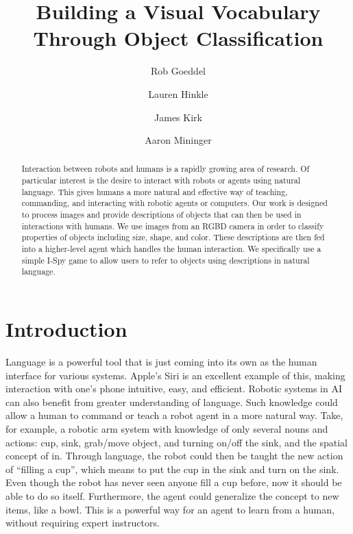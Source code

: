 \documentclass[11pt]{article}
\title{Building a Visual Vocabulary Through Object Classification}
\author{Rob Goeddel \and Lauren Hinkle \and James Kirk \and Aaron Mininger}
\date{}
\newcommand{\xxx}[1]{{\bf \color{red} #1}}
\begin{document}
\maketitle


\begin{abstract}
Interaction between robots and humans is a rapidly growing area of research.
Of particular interest is the desire to interact with robots or agents using
natural language. This gives humans a more natural and effective way of teaching,
commanding, and interacting with robotic agents or computers. Our work is
designed to process images and provide descriptions of objects that can then be
used in interactions with humans. We use images from an RGBD camera in order to
classify properties of objects including size, shape, and color. These
descriptions are then fed into a higher-level agent which handles the human
interaction. We specifically use a simple I-Spy game to allow users to refer to
objects using descriptions in natural language.
\end{abstract}


\section{Introduction}
Language is a powerful tool that is just coming into its own as the human
interface for various systems. Apple's Siri is an excellent example of this,
making interaction with one's phone intuitive, easy, and efficient. Robotic
systems in AI can also benefit from greater understanding of language. Such
knowledge could allow a human to command or teach a robot agent in a more natural
way. Take, for example, a robotic arm system with knowledge of only several nouns
and actions: cup, sink, grab/move object, and turning on/off the sink, and the
spatial concept of in. Through language, the robot could then be taught the new
action of ``filling a cup'', which means to put the cup in the sink and turn on
the sink. Even though the robot has never seen anyone fill a cup before, now it
should be able to do so itself. Furthermore, the agent could generalize the
concept to new items, like a bowl. This is a powerful way for an agent to learn
from a human, without requiring expert instructors.
\end{document}

